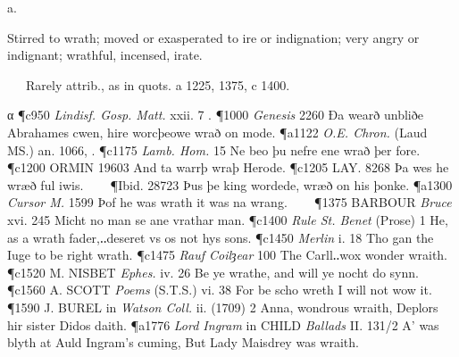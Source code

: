 \begin{description}[wide, labelwidth=!, labelindent=0pt]
 a.

\noindent {}

\noindent [OE. wráþ, = OFris. wrêth evil, OS. wrêđ (MLG. wrede, wrêt, LG. wrêd), MDu. wrêt, wreet (Du. and Flem. wreed cruel), OHG. reid, reidi (MHG. reit, reide curled, twisted), ON. *wreiðr, reiðr (Norw. vreid, reid, Da. and Sw. vred) angry, offended, f. the pa. tense of wríðan to writhe. Cf. wrath a.

   In very freq. use c 1250-c 1450. Rare (exc. in or after Biblical usage), c 1530-c 1850, being regarded as ‘out of use’ by Johnson, ‘nearly obsolete’ by Ash, but as ‘an excellent word and not obsolete’ by Webster (1828-32). Revived in sense 1, esp. in formal or dignified style, c 1800.]
\vspace{-0.3cm}

\begin{myenumerate}
 Stirred to wrath; moved or exasperated to ire or indignation; very angry or indignant; wrathful, incensed, irate.

   Rarely attrib., as in quots. a 1225, 1375, c 1400.

α \P c950 \textit{Lindisf. Gosp. Matt.} xxii. 7 .
\P 1000 \textit{Genesis}  2260 Ða wearð unbliðe Abrahames cwen, hire worcþeowe wrað on mode.
\P a1122  \textit{O.E. Chron.} (Laud MS.) an. 1066, .
\P c1175 \textit{Lamb.  Hom.} 15 Ne beo þu nefre ene wrað þer fore.
\P c1200 ORMIN  19603 And ta warrþ wraþ Herode.
\P c1205 LAY.  8268 Þa wes he wræð ful iwis.    
\P Ibid. 28723 Þus þe king wordede, wræð on his þonke.
\P a1300  \textit{Cursor M.} 1599 Þof he was wrath it was na wrang.    
\P 1375 BARBOUR  \textit{Bruce} xvi. 245 Micht no man se ane vrathar man.
\P c1400 \textit{Rule  St. Benet} (Prose) 1 He, as a wrath fader,‥deseret vs os not hys sons.
\P c1450  \textit{Merlin} i. 18 Tho gan the Iuge to be right wrath.
\P c1475 \textit{Rauf  Coilȝear} 100 The Carll‥wox wonder wraith.
\P c1520 M. NISBET  \textit{Ephes.} iv. 26 Be ye wrathe, and will ye nocht do synn.
\P c1560 A. SCOTT  \textit{Poems} (S.T.S.) vi. 38 For be scho wreth I will not wow it.    
\P 1590 J. BUREL in  \textit{Watson Coll.} ii. (1709) 2 Anna, wondrous wraith, Deplors hir sister Didos daith.
\P a1776 \textit{Lord Ingram} in CHILD  \textit{Ballads} II. 131/2 A' was blyth at Auld Ingram's cuming, But Lady Maisdrey was wraith.


\end{myenumerate}
\end{description}
